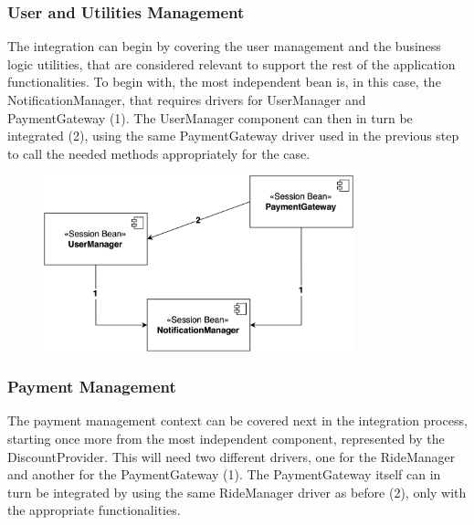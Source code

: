\subsubsection{User and Utilities Management}
The integration can begin by covering the user management and the business logic utilities, that are considered relevant to support the rest of the application functionalities. To begin with, the most independent bean is, in this case, the NotificationManager, that requires drivers for UserManager and PaymentGateway (1).
\noindent
The UserManager component can then in turn be integrated (2), using the same PaymentGateway driver used in the previous step to call the needed methods appropriately for the case.

\begin{figure}[H]
\begin{center}
		\includegraphics[width=0.8\textwidth]{./integration_strategy/diagrams/user_utilities.png}
\end{center}
\end{figure}

\subsubsection{Payment Management}
The payment management context can be covered next in the integration process, starting once more from the most independent component, represented by the DiscountProvider. This will need two different drivers, one for the RideManager and another for the PaymentGateway (1).
\noindent
The PaymentGateway itself can in turn be integrated by using the same RideManager driver as before (2), only with the appropriate functionalities.

